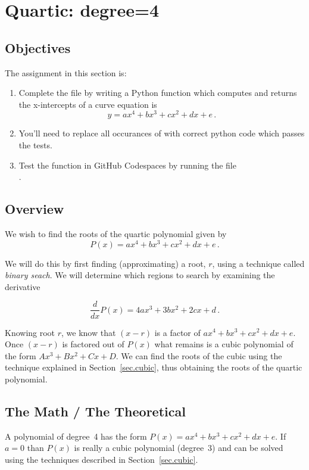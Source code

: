 \section{Quartic: degree=4}
\label{sec.quartic}

\subsection{Objectives}
The assignment in this section is:
\begin{enumerate}
\item Complete the file  by writing a Python
  function which computes and returns the x-intercepts of a curve
  equation is \[y=a x^4 + b x^3 + c x^2 + d x + e\,.\]
\item You'll need to replace all occurances of 
  with correct python code which passes the tests.
\item Test the function in GitHub Codespaces by running the file\\
  .
\end{enumerate}

\subsection{Overview}

We wish to find the roots of the quartic polynomial given by 
\[P(x) = ax^4 + b x^3 + c x^2 + d x + e\,.\]

We will do this by first finding
(approximating) a root, $r$, using a technique called \emph{binary
seach}.  We will determine which regions to search by examining the derivative

\[\frac{d}{dx} P(x) = 4ax^3 + 3b x^2 + 2c x + d\,.\]

Knowing root $r$, we know that $(x-r)$ is a factor of 
$a x^4 + b x^3 + c x^2 + d x + e$.  Once $(x-r)$ is factored out of $P(x)$
what remains is a cubic polynomial of the form $A x^3 + B x^2 + C x + D$.
We can find the roots of the cubic using the technique
explained in Section~\ref{sec.cubic}, thus obtaining the roots of
the quartic polynomial.


\subsection{The Math / The Theoretical}


A polynomial of degree~4 has the form $P(x) = a x^4 + b x^3 + c x^2 +
d x + e$. If $a=0$ than $P(x)$ is really a cubic polynomial (degree~3)
and can be solved using the techniques described in
Section~\ref{sec.cubic}.

